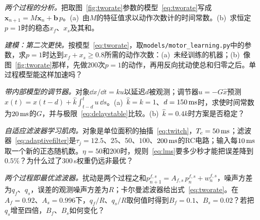 \begin{exercise}[\lvlB]
\label{ex:15:3}
\emph{两个过程的分析。}把取图~\ref{fig:tworate}参数的模型~\eqref{eq:tworate}写成$\mathbf x_{n+1}=M\mathbf x_n+\mathbf b\,p$。(a)~由$M$的特征值求以动作次数计的时间常数。(b)~求恒定$p=1$时的稳态$x_f$、$x_s$及其和。
\end{exercise}

\begin{exercise}[\lvlB]
\label{ex:15:4}
\emph{建模：第二次更快。}按模型~\eqref{eq:tworate}，取\texttt{models/\allowbreak motor\_learning.py}中的参数，求$p=1$时达到$x_f+x_s\ge0.8$所需的动作次数：(a)~未经训练的机器；(b)~像图~\ref{fig:tworate}那样，先做$200$次$p=1$的动作，再用反向扰动使总和归零之后。单过程模型能这样加速吗？
\end{exercise}

\begin{exercise}[\lvlB]
\label{ex:15:5}
\emph{带内部模型的调节器。}对象$\dd x/\dd t=ku$以延迟$d$被观测；调节器$u=-G\hat x$预测$\hat x(t)=x(t-d)+\hat k\int_{t-d}^{t}u\,\dd s$。(a)~$\hat k=k=1$、$d=150\,\text{ms}$时，求使时间常数为$20\,\text{ms}$的$G$，并与极限~\eqref{eq:delaystable}比较。(b)~$\hat k=0.4k$时方案是否稳定？
\end{exercise}

\begin{exercise}[\lvlB]
\label{ex:15:6}
\emph{自适应滤波器学习肌肉。}对象是单位面积的抽搐~\eqref{eq:twitch}，$T_c=50\,\text{ms}$；滤波器~\eqref{eq:adaptivefilter}是$\tau_j=12.5$、$25$、$50$、$100$、$200\,\text{ms}$的RC电路；输入每$10\,\text{ms}$取一个新的正态随机数。$\eta=50$和$200$时，规则~\eqref{eq:lms}要多少秒才能把误差降到$0.5\%$？为什么过了$300$\,s权重仍远非最优？
\end{exercise}

\begin{exercise}[\lvlC]
\label{ex:15:7}
\emph{两个过程即最优滤波器。}扰动是两个过程之和$p^{f,s}_{n+1}=A_{f,s}\,p^{f,s}_n+w^{f,s}_n$，噪声方差为$q_f$、$q_s$，误差的观测噪声方差为$R$；卡尔曼滤波器给出式~\eqref{eq:tworate}。在$A_f=0.92$、$A_s=0.996$下，$q_f/R$、$q_s/R$取何值时得到$B_f=0.1$、$B_s=0.02$？若把$q_s$增至四倍，$B_f$、$B_s$如何变化？
\end{exercise}
